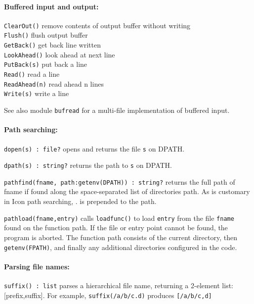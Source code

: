 \paragraph{Buffered input and output:}
\texttt{ClearOut()} remove contents of output buffer without
writing\\
\texttt{Flush()} flush output buffer\\
\texttt{GetBack()} get back line written\\
\texttt{LookAhead()} look ahead at next line\\
\texttt{PutBack(s)} put back a line\\
\texttt{Read()} read a line\\
\texttt{ReadAhead(n)} read ahead n lines\\
\texttt{Write(s)} write a line

See also module \texttt{bufread} for a multi-file implementation of
buffered input.

\paragraph{Path searching:}
\texttt{dopen(s) : file?} opens and returns the file \texttt{s} on
DPATH.

\texttt{dpath(s) : string?} returns the path to \texttt{s} on DPATH.

\texttt{pathfind(fname,
path:getenv({\textquotedbl}DPATH{\textquotedbl})) : string?} returns
the full path of fname if found along the space-separated list of
directories {\textquotedbl}path{\textquotedbl}. As is customary in Icon
path searching, {\textquotedbl}.{\textquotedbl} is prepended to the
path.

\texttt{pathload(fname,entry)} calls \texttt{loadfunc()} to load
\texttt{entry} from the file \texttt{fname} found on the function path.
If the file or entry point cannot be found, the program is aborted. The
function path consists of the current directory, then
\texttt{getenv({\textquotedbl}FPATH{\textquotedbl})}, and finally any
additional directories configured in the code.

\paragraph[Parsing file names:]{Parsing file names:}
\texttt{suffix() : list} parses a hierarchical file name, returning a
2-element list: [prefix,suffix]. For example,
\texttt{suffix({\textquotedbl}/a/b/c.d{\textquotedbl})} produces
\texttt{[{\textquotedbl}/a/b/c{\textquotedbl},{\textquotedbl}d{\textquotedbl}]}

